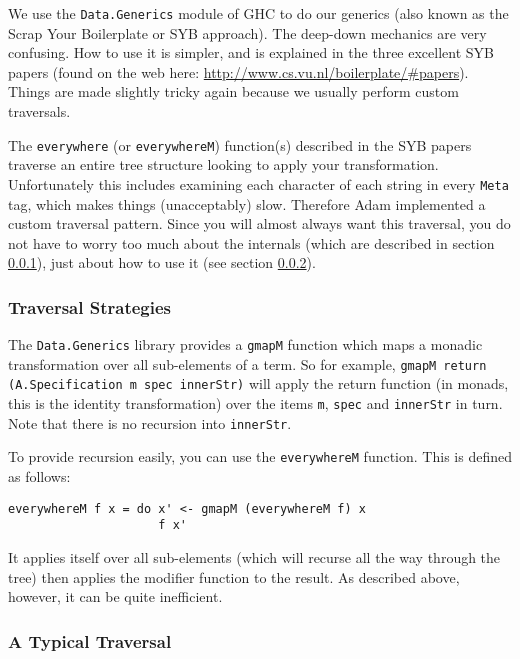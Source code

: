 \documentclass[a4wide]{article}
\begin{document}
We use the \lstinline|Data.Generics| module of GHC to do our generics (also known as the Scrap Your
Boilerplate or SYB approach).  The deep-down mechanics are very confusing.  How to use it is simpler,
and is explained in the three excellent SYB papers (found on the web here:
\url{http://www.cs.vu.nl/boilerplate/#papers}).  Things are made slightly tricky again because
we usually perform custom traversals.

The \lstinline|everywhere| (or \lstinline|everywhereM|) function(s) described in the SYB papers traverse an entire tree
structure looking to apply your transformation.  Unfortunately this includes examining each character
of each string in every \lstinline|Meta| tag, which makes things (unacceptably) slow.  Therefore Adam implemented
a custom traversal pattern.  Since you will almost always want this traversal, you do not have to
worry too much about the internals (which are described in section \ref{traverse-detail}), just about how to use it
(see section \ref{traverse-common}).

\subsubsection{Traversal Strategies}
\label{traverse-detail}

The \lstinline|Data.Generics| library provides a \lstinline|gmapM| function which maps a monadic transformation
over all sub-elements of a term.  So for example, \lstinline|gmapM return (A.Specification m spec innerStr)|
will apply the return function (in monads, this is the identity transformation) over the items \lstinline|m|,
\lstinline|spec| and \lstinline|innerStr| in turn.  Note that there is no recursion into \lstinline|innerStr|.

To provide recursion easily, you can use the \lstinline|everywhereM| function.  This is defined as follows:

\begin{lstlisting}
everywhereM f x = do x' <- gmapM (everywhereM f) x
                     f x'
\end{lstlisting}

It applies itself over all sub-elements (which will recurse all the way through the tree) then applies
the modifier function to the result.  As described above, however, it can be quite inefficient.

\subsubsection{A Typical Traversal}
\label{traverse-common}
\end{document}
